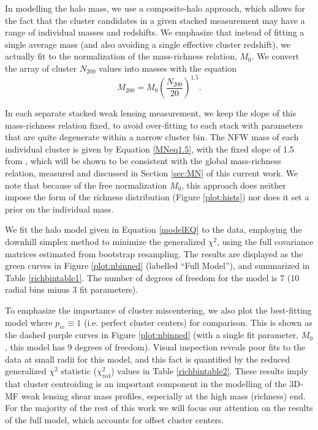 In modelling the halo mass, we use a composite-halo approach, which allows for the fact that the cluster candidates in a given stacked measurement may have a range of individual masses and redshifts. We emphasize that instead of fitting a single average mass (and also avoiding a single effective cluster redshift), we actually fit to the normalization of the mass-richness relation, $M_0$. We convert the array of cluster $N_{200}$ values into masses with the equation
\begin{equation}
\label{MNeq1.5}
M_{200} = M_0 \left( \frac{N_{200}}{20} \right)^{1.5}.
\end{equation}

In each separate stacked weak lensing measurement, we keep the slope of this mass-richness relation fixed, to avoid over-fitting to each stack with parameters that are quite degenerate within a narrow cluster bin. The \ac{NFW} mass of each individual cluster is given by Equation \ref{MNeq1.5}, with the fixed slope of 1.5 from \citet{Ford14}, which will be shown to be consistent with the global mass-richness relation, measured and discussed in Section \ref{sec:MN} of this current work. We note that because of the free normalization $M_0$, this approach does neither impose the form of the richness distribution (Figure \ref{plot:hists}) nor does it set a prior on the individual mass.

We fit the halo model given in Equation \ref{modelEQ} to the data, employing the downhill simplex method to minimize the generalized $\chi^2$, using the full covariance matrices estimated from bootstrap resampling. The results are displayed as the green curves in Figure \ref{plot:nbinned} (labelled ``Full Model''), and summarized in Table \ref{richbintable1}. The number of degrees of freedom for the model is 7 (10 radial bins minus 3 fit parameters). 

To emphasize the importance of cluster miscentering, we also plot the best-fitting model where $p_{\mathrm{cc}} \equiv 1$ (i.e. perfect cluster centers) for comparison. This is shown as the dashed purple curves in Figure \ref{plot:nbinned} (with a single fit parameter, $M_0$, this model has 9 degrees of freedom). Visual inspection reveals poor fits to the data at small radii for this model, and this fact is quantified by the reduced generalized $\chi^2$ statistic ($\chi^2_{\mathrm{red}}$) values in Table \ref{richbintable2}. These results imply that cluster centroiding is an important component in the modelling of the \ac{3D-MF} weak lensing shear mass profiles, especially at the high mass (richness) end. For the majority of the rest of this work we will focus our attention on the results of the full model, which accounts for offset cluster centers.

